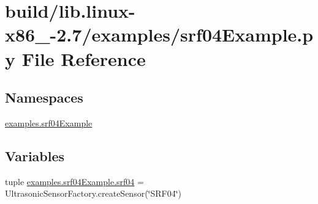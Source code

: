 \hypertarget{build_2lib_8linux-x86__64-2_87_2examples_2srf04Example_8py}{}\section{build/lib.linux-\/x86\+\_-\/2.7/examples/srf04\+Example.py File Reference}
\label{build_2lib_8linux-x86__64-2_87_2examples_2srf04Example_8py}
\subsection*{Namespaces}
\begin{DoxyCompactItemize}
\item 
 \hyperlink{namespaceexamples_1_1srf04Example}{examples.\+srf04\+Example}
\end{DoxyCompactItemize}
\subsection*{Variables}
\begin{DoxyCompactItemize}
\item 
tuple \hyperlink{namespaceexamples_1_1srf04Example_ade1fcf52de74516f9ebae9ac5c6f6cf7}{examples.\+srf04\+Example.\+srf04} = Ultrasonic\+Sensor\+Factory.\+create\+Sensor(\char`\"{}S\+R\+F04\char`\"{})
\end{DoxyCompactItemize}
